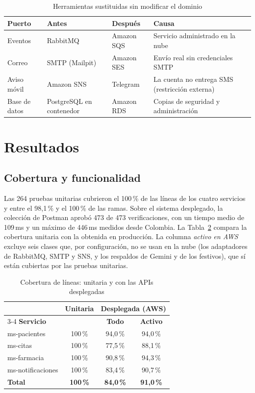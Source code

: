 \documentclass[conference]{IEEEtran}
\begin{document}
\begin{table}[t]
\centering
\caption{Herramientas sustituidas sin modificar el dominio}
\label{tab:reemplazos}
\renewcommand{\arraystretch}{1.15}
\begin{tabular}{@{}p{14mm}p{16mm}p{16mm}p{23mm}@{}}
\toprule
\textbf{Puerto} & \textbf{Antes} & \textbf{Después} & \textbf{Causa} \\
\midrule
Eventos & RabbitMQ & Amazon SQS & Servicio administrado en la nube \\
Correo & SMTP (Mailpit) & Amazon SES & Envío real sin credenciales SMTP \\
Aviso móvil & Amazon SNS & Telegram & La cuenta no entrega SMS (restricción externa) \\
Base de datos & PostgreSQL en contenedor & Amazon RDS & Copias de seguridad y administración \\
\bottomrule
\end{tabular}
\end{table}

\section{Resultados}
\subsection{Cobertura y funcionalidad}
Las 264 pruebas unitarias cubrieron el 100\,\% de las líneas de los cuatro servicios y entre el 98,1\,\% y el 100\,\% de las ramas. Sobre el sistema desplegado, la colección de Postman aprobó 473 de 473 verificaciones, con un tiempo medio de 109\,ms y un máximo de 446\,ms medidos desde Colombia. La Tabla~\ref{tab:cobertura} compara la cobertura unitaria con la obtenida en producción. La columna \emph{activo en AWS} excluye seis clases que, por configuración, no se usan en la nube (los adaptadores de RabbitMQ, SMTP y SNS, y los respaldos de Gemini y de los festivos), que sí están cubiertas por las pruebas unitarias.

\begin{table}[t]
\centering
\caption{Cobertura de líneas: unitaria y con las APIs desplegadas}
\label{tab:cobertura}
\renewcommand{\arraystretch}{1.1}
\begin{tabular}{@{}lccc@{}}
\toprule
& \textbf{Unitaria} & \multicolumn{2}{c}{\textbf{Desplegada (AWS)}} \\
\cmidrule(l){3-4}
\textbf{Servicio} & & \textbf{Todo} & \textbf{Activo} \\
\midrule
ms-pacientes & 100\,\% & 94,0\,\% & 94,0\,\% \\
ms-citas & 100\,\% & 77,5\,\% & 88,1\,\% \\
ms-farmacia & 100\,\% & 90,8\,\% & 94,3\,\% \\
ms-notificaciones & 100\,\% & 83,4\,\% & 90,7\,\% \\
\midrule
\textbf{Total} & \textbf{100\,\%} & \textbf{84,0\,\%} & \textbf{91,0\,\%} \\
\bottomrule
\end{tabular}
\end{table}
\end{document}
